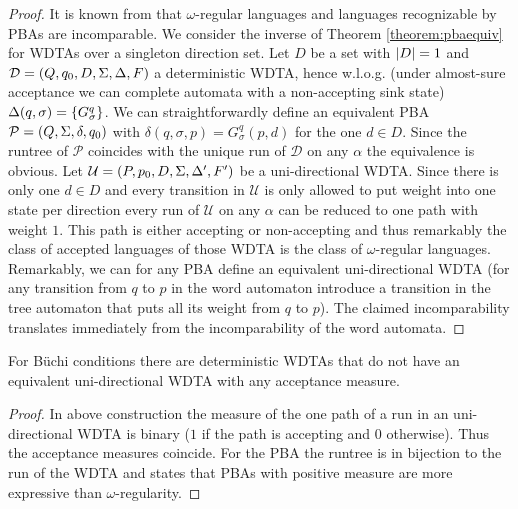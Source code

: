 \begin{proof}
  It is known from \cite[Theorem 4 (b), (c)]{DecProblemsForProbAuto} that
  $\omega$-regular languages and languages recognizable by \acp{PBA} are
  incomparable. We consider the inverse of Theorem \ref{theorem:pbaequiv} for
  \acp{WDTA} over a singleton direction set. Let $D$ be a set with $\left\vert{D}\right\vert=1$
  and $\mathcal{D} = \left(Q, q_{0}, D, \Sigma, \Delta, F\right)$ a deterministic
  \ac{WDTA}, hence w.l.o.g. (under almost-sure acceptance we can complete
  automata with a non-accepting sink state)
  $\Delta(q,\sigma) = \left\{G^{q}_{\sigma}\right\}$. We can straightforwardly define an
  equivalent \ac{PBA} $\mathcal{P} = \left(Q, \Sigma, \delta, q_{0}\right)$ with
  $\delta(q, \sigma, p) = G^{q}_{\sigma}(p, d)$ for the one $d\in D$. Since the
  runtree of $\mathcal{P}$ coincides with the unique run of $\mathcal{D}$ on
  any $\alpha$ the equivalence is obvious. Let
  $\mathcal{U} = \left(P, p_{0}, D, \Sigma, \Delta', F'\right)$ be a uni-directional
  \ac{WDTA}. Since there is only one $d\in D$ and every transition in
  $\mathcal{U}$ is only allowed to put weight into one state per direction
  every run of $\mathcal{U}$ on any $\alpha$ can be reduced to one path with
  weight $1$. This path is either accepting or non-accepting and thus
  remarkably the class of accepted languages of those \ac{WDTA} is the class
  of $\omega$-regular languages. Remarkably, we can for any \ac{PBA} define an
  equivalent uni-directional \ac{WDTA} (for any transition from $q$ to $p$ in
  the word automaton introduce a transition in the tree automaton that puts all
  its weight from $q$ to $p$). The claimed incomparability translates
  immediately from the incomparability of the word automata.
\end{proof}
\begin{corollary}
  For Büchi conditions there are deterministic \acp{WDTA} that do not have an
  equivalent uni-directional \ac{WDTA} with any acceptance measure.
\end{corollary}
\begin{proof}
  In above construction the measure of the one path of a run in an
  uni-directional \ac{WDTA} is binary ($1$ if the path is accepting and $0$
  otherwise). Thus the acceptance measures coincide. For the \ac{PBA} the
  runtree is in bijection to the run of the \ac{WDTA} and
  \cite[Theorem 4]{RecOmeLangProbAuto} states that \acp{PBA} with positive
  measure are more expressive than $\omega$-regularity.
\end{proof}
